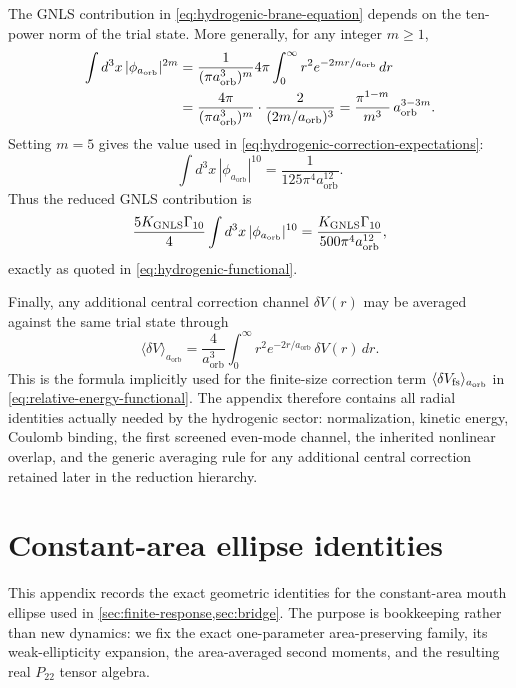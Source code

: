 \documentclass[11pt]{article}
\theoremstyle{plain}
\theoremstyle{definition}
\theoremstyle{remark}
\newcommand{\Ptwotwo}{P_{22}}
\newcommand{\aorb}{a_{\mathrm{orb}}}
\begin{document}
The GNLS contribution in \cref{eq:hydrogenic-brane-equation} depends on the ten-power norm of the trial state. More generally, for any integer $m\ge 1$,
\begin{align}
\int d^3x\,|\phi_{\aorb}|^{2m}
&=
\frac{1}{(\pi\aorb^3)^m}4\pi\int_0^\infty r^2 e^{-2mr/\aorb}\,dr
\notag\\
&=
\frac{4\pi}{(\pi\aorb^3)^m}\cdot\frac{2}{(2m/\aorb)^3}
=
\frac{\pi^{1-m}}{m^3}\,\aorb^{3-3m}.
\label{eq:appendix-general-2m-norm}
\end{align}
Setting $m=5$ gives the value used in \cref{eq:hydrogenic-correction-expectations}:
\begin{equation}
\int d^3x\,|\phi_{\aorb}|^{10}
=
\frac{1}{125\pi^4\aorb^{12}}.
\label{eq:appendix-ten-power-norm}
\end{equation}
Thus the reduced GNLS contribution is
\begin{equation}
\frac{5K_{\rm GNLS}\Gamma_{10}}{4}
\int d^3x\,|\phi_{\aorb}|^{10}
=
\frac{K_{\rm GNLS}\Gamma_{10}}{500\pi^4\aorb^{12}},
\label{eq:appendix-gnls-energy}
\end{equation}
exactly as quoted in \cref{eq:hydrogenic-functional}.

Finally, any additional central correction channel $\delta V(r)$ may be averaged against the same trial state through
\begin{equation}
\bigl\langle \delta V\bigr\rangle_{\aorb}
=
\frac{4}{\aorb^3}\int_0^\infty r^2 e^{-2r/\aorb}\,\delta V(r)\,dr.
\label{eq:appendix-generic-central-correction}
\end{equation}
This is the formula implicitly used for the finite-size correction term $\langle\delta V_{\rm fs}\rangle_{\aorb}$ in \cref{eq:relative-energy-functional}. The appendix therefore contains all radial identities actually needed by the hydrogenic sector: normalization, kinetic energy, Coulomb binding, the first screened even-mode channel, the inherited nonlinear overlap, and the generic averaging rule for any additional central correction retained later in the reduction hierarchy.

\section{Constant-area ellipse identities}\label{app:ellipse}

This appendix records the exact geometric identities for the constant-area mouth ellipse used in \cref{sec:finite-response,sec:bridge}. The purpose is bookkeeping rather than new dynamics: we fix the exact one-parameter area-preserving family, its weak-ellipticity expansion, the area-averaged second moments, and the resulting real \(\Ptwotwo\) tensor algebra.
\end{document}
